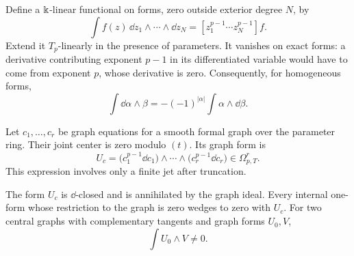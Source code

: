 Define a \(\Bbbk\)-linear functional on forms, zero outside exterior degree
\(N\), by
\[
 \int f(z)\,\dd z_1\wedge\cdots\wedge\dd z_N
   =[z_1^{p-1}\cdots z_N^{p-1}]f .
\]
Extend it \(T_p\)-linearly in the presence of parameters.
It vanishes on exact forms: a derivative contributing exponent \(p-1\)
in its differentiated variable would have to come from exponent \(p\),
whose derivative is zero.  Consequently, for homogeneous forms,
\begin{equation}\label{eq:tensor-integration-by-parts}
 \int\dd\alpha\wedge\beta
       =-(-1)^{|\alpha|}\int\alpha\wedge\dd\beta .
\end{equation}

Let \(c_1,\ldots,c_r\) be graph equations for a smooth formal graph over
the parameter ring.  Their joint center is zero modulo \((t)\).
Its graph form is
\begin{equation}\label{eq:tensor-thom-form}
 U_c=\bigl(c_1^{p-1}\dd c_1\bigr)\wedge\cdots\wedge
                       \bigl(c_r^{p-1}\dd c_r\bigr)
       \in\Omega_{p,T}^{r}.
\end{equation}
This expression involves only a finite jet after truncation.

\begin{lemma}\label{lem:tensor-graph-form}
The form \(U_c\) is \(\dd\)-closed and is annihilated by the graph ideal.
Every internal one-form whose restriction to the graph is zero wedges
to zero with \(U_c\).
For two central graphs with complementary tangents and graph forms
\(U_0,V\),
\begin{equation}\label{eq:tensor-nonzero-pairing}
                     \int U_0\wedge V\ne0 .
\end{equation}
\end{lemma}

